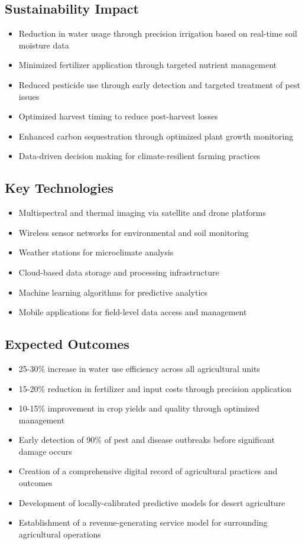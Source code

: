 \subsection{Sustainability Impact}
\begin{itemize}
    \item Reduction in water usage through precision irrigation based on real-time soil moisture data
    \item Minimized fertilizer application through targeted nutrient management
    \item Reduced pesticide use through early detection and targeted treatment of pest issues
    \item Optimized harvest timing to reduce post-harvest losses
    \item Enhanced carbon sequestration through optimized plant growth monitoring
    \item Data-driven decision making for climate-resilient farming practices
\end{itemize}

\subsection{Key Technologies}
\begin{itemize}
    \item Multispectral and thermal imaging via satellite and drone platforms
    \item Wireless sensor networks for environmental and soil monitoring
    \item Weather stations for microclimate analysis
    \item Cloud-based data storage and processing infrastructure
    \item Machine learning algorithms for predictive analytics
    \item Mobile applications for field-level data access and management
\end{itemize}

\subsection{Expected Outcomes}
\begin{itemize}
    \item 25-30\% increase in water use efficiency across all agricultural units
    \item 15-20\% reduction in fertilizer and input costs through precision application
    \item 10-15\% improvement in crop yields and quality through optimized management
    \item Early detection of 90\% of pest and disease outbreaks before significant damage occurs
    \item Creation of a comprehensive digital record of agricultural practices and outcomes
    \item Development of locally-calibrated predictive models for desert agriculture
    \item Establishment of a revenue-generating service model for surrounding agricultural operations
\end{itemize}

